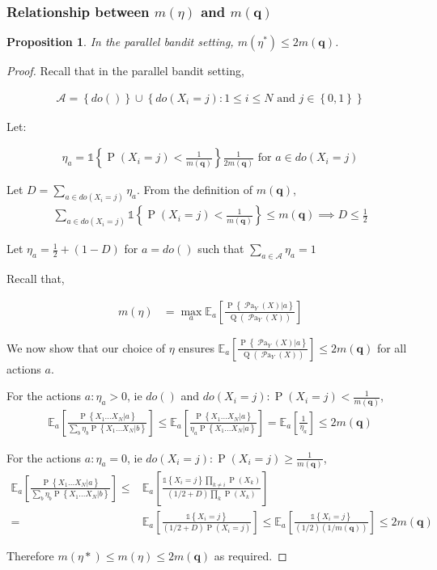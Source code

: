\documentclass[11pt,a4paper,twoside]{report}
\newcommand{\Q}[1]{\operatorname{Q}\left(#1\right)}
\newcommand{\EE}{\mathbb E}
\newcommand{\EEa}{\EE_a}
\newcommand{\Pn}[2]{\operatorname{P}\left\{#2|#1\right\}}
\newcommand{\calA}{\mathcal A}
\newcommand{\set}[1]{\left\{#1\right\}}
\newcommand{\ind}[1]{\mathds{1}\!\!\set{#1}}
\newcommand{\eq}[1]{\begin{align*}#1\end{align*}}
\renewcommand{\P}[1]{\operatorname{P}\left(#1\right)}
\newcommand{\parents}[1]{\operatorname{\mathcal{P}a}_{#1}}
\theoremstyle{plain}
\newtheorem{proposition}[theorem]{Proposition}
\theoremstyle{definition}
\begin{document}
\subsubsection{Relationship between $m(\eta)$ and $m(\boldsymbol{q})$}\label{sec:m-equivelence}

\begin{proposition} In the parallel bandit setting,
$m(\eta^*) \leq 2m(\boldsymbol{q})$.
\end{proposition} 

\begin{proof}

Recall that in the parallel bandit setting,

\eq{
\mathcal{A} = \set{do()} \cup \set{ do(X_i = j) \colon 1 \leq i \leq N \text{ and } j \in \set{0,1}}
}

Let:

\eq {
\eta_a = \ind{\P{X_i = j} < \frac{1}{m(\boldsymbol{q})}}\frac{1}{2m(\boldsymbol{q})} \text { for } a \in do(X_i = j)
}

Let $D =\sum_{a\in do(X_i=j)}\eta_a$. From the definition of $m(\boldsymbol{q})$, 
\eq {
\sum_{a\in do(X_i=j)} \ind{\P{X_i = j} < \frac{1}{m(\boldsymbol{q})}} \leq m(\boldsymbol{q}) \implies D \leq \frac{1}{2}
}
 
Let $\eta_a = \frac{1}{2} + (1-D)$ for $a = do()$ such that $\sum_{a \in \calA}\eta_a = 1$ 

Recall that,

\eq{
m(\eta) &
= \max_a \EEa\left[\frac{\Pn{a}{\parents{Y}(X)}}{\Q{\parents{Y}(X)}}\right]
}

We now show that our choice of $\eta$ ensures $\EEa\left[\frac{\Pn{a}{\parents{Y}(X)}}{\Q{\parents{Y}(X)}}\right] \leq 2m(\boldsymbol{q})$ for all actions $a$.

For the actions $a: \eta_a > 0$, ie $do()$ and $do(X_i = j):\P{X_i=j}<\frac{1}{m(\boldsymbol{q})}$,
\eq{
\EEa\left[\frac{\Pn{a}{X_1...X_N}}{\sum_{b}\eta_b\Pn{b}{X_1...X_N}}\right] \leq \EEa\left[\frac{\Pn{a}{X_1...X_N}}{\eta_a\Pn{a}{X_1...X_N}}\right] = \EEa\left[\frac{1}{\eta_a}\right] \leq 2m(\boldsymbol{q})
}

For the actions $a :\eta_a = 0$, ie $do(X_i=j):\P{X_i=j}\geq\frac{1}{m(\boldsymbol{q})}$,
\eq{
\EEa\left[\frac{\Pn{a}{X_1...X_N}}{\sum_{b}\eta_b\Pn{b}{X_1...X_N}}\right] \leq & \EEa\left[\frac{\ind{X_i=j}\prod_{k\neq i}\P{X_k}}{(1/2+D)\prod_k \P{X_k}}\right] \\=& \EEa\left[\frac{\ind{X_i=j}}{(1/2+D)\P{X_i = j}}\right]
\leq  \EEa\left[\frac{\ind{X_i=j}}{(1/2)(1/m(\boldsymbol{q}))}\right] \leq 2m(\boldsymbol{q})
}

Therefore $m(\eta*) \leq m(\eta) \leq 2m(\boldsymbol{q})$ as required.

\end{proof}
\end{document}
